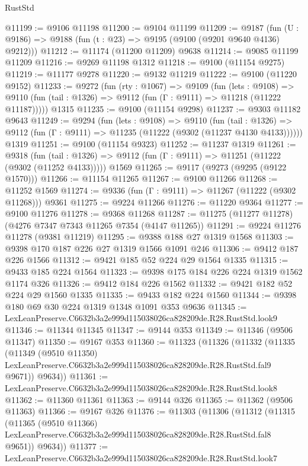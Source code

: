 \begin{lexlean}{RustStd}
\begin{coremodule}
@11199 := @9106 @11198
@11200 := @9104 @11199
@11209 := @9187
    (fun (U : @9186) => @9188 (fun (t : @23) => @9195 (@9100 (@9201 @9640 @4136) @9212)))
@11212 := @11174 (@11200 @11209) @9638
@11214 := @9085 @11199 @11209
@11216 := @9269 @11198 @1312
@11218 := @9100 (@11154 @9275)
@11219 := @11177 @9278
@11220 := @9132 @11219
@11222 := @9100 (@11220 @9152)
@11233 := @9272
    (fun (rty : @1067) =>
    @9109
      (fun (lets : @9108) =>
      @9110 (fun (tail : @1326) => @9112 (fun (Γ : @9111) => @11218 (@11222 @11187)))))
    @1315
@11235 := @9100 (@11154 @9298)
@11237 := @9303 @11182 @9643
@11249 := @9294
    (fun (lets : @9108) =>
    @9110
      (fun (tail : @1326) =>
      @9112 (fun (Γ : @9111) => @11235 (@11222 (@9302 (@11237 @4130 @4133))))))
    @1319
@11251 := @9100 (@11154 @9323)
@11252 := @11237 @1319
@11261 := @9318
    (fun (tail : @1326) => @9112 (fun (Γ : @9111) => @11251 (@11222 (@9302 (@11252 @4133)))))
    @1569
@11265 := @9117 (@9273 (@9295 (@9122 @1570)))
@11266 := @11154 @11265
@11267 := @9100 @11266
@11268 := @11252 @1569
@11274 := @9336 (fun (Γ : @9111) => @11267 (@11222 (@9302 @11268))) @9361
@11275 := @9224 @11266
@11276 := @11220 @9364
@11277 := @9100 @11276
@11278 := @9368 @11268
@11287 := @11275 (@11277 @11278) (@4276 @7347 @7343 @11265 @7354 (@4147 @11265))
@11291 := @9224 @11276 @11278 (@9381 @11219)
@11295 := @9388 @188 @27 @1319 @1568
@11303 := @9398 @170 @187 @226 @27 @1319 @1566 @1091 @246
@11306 := @9412 @187 @226 @1566
@11312 := @9421 @185 @52 @224 @29 @1564 @1335
@11315 := @9433 @185 @224 @1564
@11323 := @9398 @175 @184 @226 @224 @1319 @1562 @1174 @326
@11326 := @9412 @184 @226 @1562
@11332 := @9421 @182 @52 @224 @29 @1560 @1335
@11335 := @9433 @182 @224 @1560
@11344 := @9398 @180 @69 @30 @224 @1319 @1348 @1091 @353 @9636
@11345 := LexLeanPreserve.C6632b3a2e999d115038026ca828209de.R28.RustStd.look9
@11346 := @11344 @11345
@11347 := @9144 @353
@11349 := @11346 (@9506 @11347)
@11350 := @9167 @353
@11360 := @11323
    (@11326
      (@11332
        (@11335
          (@11349
            (@9510 @11350)
            LexLeanPreserve.C6632b3a2e999d115038026ca828209de.R28.RustStd.fal9
            @9671))
        @9634))
@11361 := LexLeanPreserve.C6632b3a2e999d115038026ca828209de.R28.RustStd.look8
@11362 := @11360 @11361
@11363 := @9144 @326
@11365 := @11362 (@9506 @11363)
@11366 := @9167 @326
@11376 := @11303
    (@11306
      (@11312
        (@11315
          (@11365
            (@9510 @11366)
            LexLeanPreserve.C6632b3a2e999d115038026ca828209de.R28.RustStd.fal8
            @9651))
        @9634))
@11377 := LexLeanPreserve.C6632b3a2e999d115038026ca828209de.R28.RustStd.look7

\end{coremodule}
\end{lexlean}
